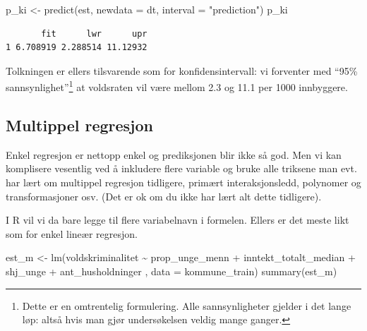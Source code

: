 \documentclass[
  letterpaper,
  DIV=11,
  numbers=noendperiod]{scrreprt}
\newenvironment{Shaded}{\begin{snugshade}}{\end{snugshade}}
\newcommand{\AttributeTok}[1]{\textcolor[rgb]{0.40,0.45,0.13}{#1}}
\newcommand{\FunctionTok}[1]{\textcolor[rgb]{0.28,0.35,0.67}{#1}}
\newcommand{\NormalTok}[1]{\textcolor[rgb]{0.00,0.23,0.31}{#1}}
\newcommand{\OtherTok}[1]{\textcolor[rgb]{0.00,0.23,0.31}{#1}}
\newcommand{\SpecialCharTok}[1]{\textcolor[rgb]{0.37,0.37,0.37}{#1}}
\newcommand{\StringTok}[1]{\textcolor[rgb]{0.13,0.47,0.30}{#1}}
\begin{document}
\begin{Shaded}
\begin{Highlighting}[]
\NormalTok{p\_ki }\OtherTok{\textless{}{-}} \FunctionTok{predict}\NormalTok{(est, }\AttributeTok{newdata =}\NormalTok{ dt, }\AttributeTok{interval =} \StringTok{"prediction"}\NormalTok{)}
\NormalTok{p\_ki}
\end{Highlighting}
\end{Shaded}

\begin{verbatim}
       fit      lwr      upr
1 6.708919 2.288514 11.12932
\end{verbatim}

Tolkningen er ellers tilsvarende som for konfidensintervall: vi
forventer med ``95\% sannsynlighet''\footnote{Dette er en omtrentelig
  formulering. Alle sannsynligheter gjelder i det lange løp: altså hvis
  man gjør undersøkelsen veldig mange ganger.} at voldsraten vil være
mellom 2.3 og 11.1 per 1000 innbyggere.

\subsection{Multippel regresjon}\label{multippel-regresjon}

Enkel regresjon er nettopp enkel og prediksjonen blir ikke så god. Men
vi kan komplisere vesentlig ved å inkludere flere variable og bruke alle
triksene man evt. har lært om multippel regresjon tidligere, primært
interaksjonsledd, polynomer og transformasjoner osv. (Det er ok om du
ikke har lært alt dette tidligere).

I R vil vi da bare legge til flere variabelnavn i formelen. Ellers er
det meste likt som for enkel lineær regresjon.

\begin{Shaded}
\begin{Highlighting}[]
\NormalTok{est\_m }\OtherTok{\textless{}{-}} \FunctionTok{lm}\NormalTok{(voldskriminalitet }\SpecialCharTok{\textasciitilde{}}\NormalTok{ prop\_unge\_menn }\SpecialCharTok{+}\NormalTok{ inntekt\_totalt\_median }\SpecialCharTok{+}\NormalTok{ shj\_unge }\SpecialCharTok{+}
\NormalTok{                   ant\_husholdninger ,}
            \AttributeTok{data =}\NormalTok{ kommune\_train)}
\FunctionTok{summary}\NormalTok{(est\_m)}
\end{Highlighting}
\end{Shaded}
\end{document}
